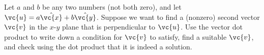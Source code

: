 Let $a$ and $b$ be any two numbers (not both zero),
and let $\vc{u}=a\hat{\vc{x}}+b\hat{\vc{y}}$.
Suppose we want to find
a (nonzero) second vector $\vc{v}$ in the $x$-$y$ plane
that is perpendicular to $\vc{u}$.
Use the vector dot product to write down a condition
for $\vc{v}$ to satisfy, find a suitable $\vc{v}$,
and check using the dot product that it is indeed a solution.

